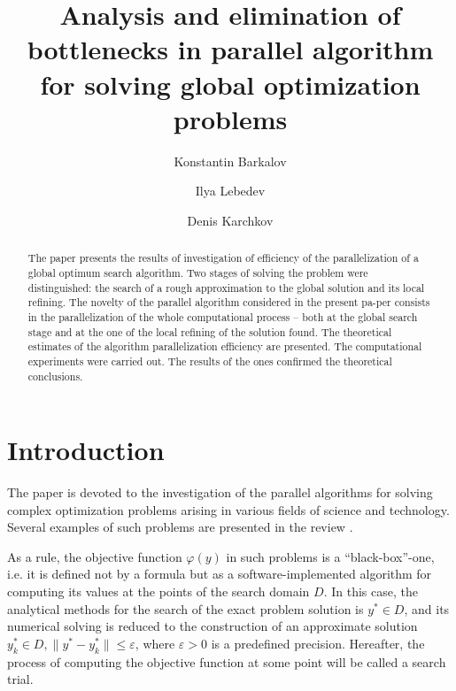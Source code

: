 \documentclass[runningheads]{llncs}
\begin{document}
%
\title{Analysis and elimination of bottlenecks in parallel algorithm for solving global optimization problems}
%
%
\author{
Konstantin Barkalov  \and
Ilya Lebedev  \and
Denis Karchkov 
}
%
%

%
\maketitle              %
%
\begin{abstract}
The paper presents the results of investigation of efficiency of the parallelization of a global optimum search algorithm. Two stages of solving the problem were distinguished: the search of a rough approximation to the global solution and its local refining. The novelty of the parallel algorithm considered in the present pa-per consists in the parallelization of the whole computational process – both at the global search stage and at the one of the local refining of the solution found. The theoretical estimates of the algorithm parallelization efficiency are presented. The computational experiments were carried out. The results of the ones confirmed the theoretical conclusions.

\end{abstract}
%
%
%
\section{Introduction}

The paper is devoted to the investigation of the parallel algorithms for solving complex optimization problems arising in various fields of science and technology. Several examples of such problems are presented in the review \cite{Pinter2006}.

As a rule, the objective function $\varphi(y)$ in such problems is a ``black-box''-one, i.e. it is defined not by a formula but as a software-implemented algorithm for computing its values at the points of the search domain $D$. In this case, the analytical methods for the search of the exact problem solution is $y^{*} \in D$, and its numerical solving is reduced to the construction of an approximate solution $y_k^* \in D, \|y^{*} - y_k^*\| \leq \varepsilon$, where $\varepsilon > 0$ is a predefined precision. Hereafter, the process of computing the objective function at some point will be called a search trial.
\end{document}
